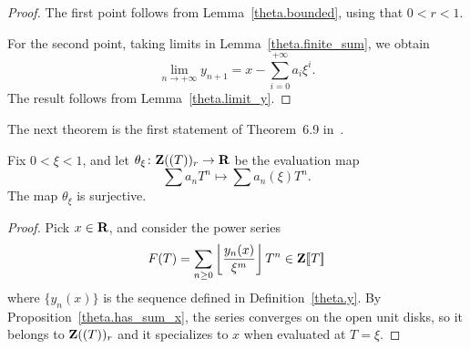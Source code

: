 \begin{proof} 
  \leanok
  The first point follows from Lemma~\ref{theta.bounded}, using that $0<r<1$.

  For the second point, taking limits in Lemma~\ref{theta.finite_sum}, we obtain
  \[
    \lim_{n\to +\infty}y_{n+1}=x-\sum_{i=0}^{+\infty}a_i\xi^i.
  \]
  The result follows from Lemma~\ref{theta.limit_y}.
\end{proof}

The next theorem is the first statement of Theorem~6.9 in~\cite{Analytic}.
\begin{theorem}
  \label{theta.surjective}
  \leanok
  Fix $0<\xi <1$, and let $\theta_{\xi}\colon \mathbf{Z}((T))_r\rightarrow \mathbf{R}$ be the evaluation map
  \[
    \sum a_nT^n\longmapsto \sum a_n(\xi)T^n.
  \]
  The map $\theta_{\xi}$ is surjective.
\end{theorem}

\begin{proof}
  \leanok
  Pick $x\in \mathbf{R}$, and consider the power series
  \[
    F(T)=\sum_{n\geq 0}\left\lfloor \frac{y_n(x)}{\xi^m}\right\rfloor T^n\in\mathbf{Z}[\![T]\!]
  \]
  where $\{y_n(x)\}$ is the sequence defined in Definition~\ref{theta.y}.
  By Proposition~\ref{theta.has_sum_x}, the series converges on the open unit disks,
  so it belongs to $\mathbf{Z}((T))_r$ and it specializes to $x$ when evaluated at $T=\xi$.
\end{proof}


